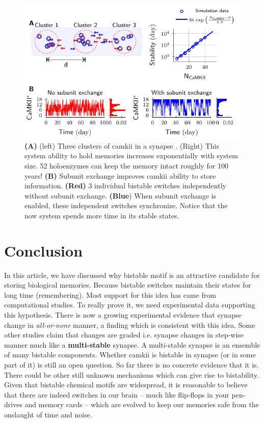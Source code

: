 \documentclass[]{resonance}
\begin{document}
\begin{figure}[t!]
    \caption{ \textbf{(A)} (left) Three clusters of \gls{camkii} in a synapse
        . (Right) This system ability to hold memories increases exponentially
        with system size. 52 holoenzymes can keep the memory intact roughly for
        100 years! \textbf{(B)} Subunit exchange improves \gls{camkii} ability
        to store information. \textbf{(Red)} 3 individual bistable switches independently  
        without subunit exchange. \textbf{(Blue}) When subunit exchange is enabled, these 
        independent switches synchronize. Notice that the now system spends more 
        time in its stable states.
    }\label{fig:camkii_sync}
    \includegraphics[width=\linewidth]{./bistable/Fig5/figure_sync_114mm.pdf}
\end{figure}


\section{Conclusion}

In this article, we have discussed why bistable motif is an attractive candidate
for storing biological memories. Because bistable switches maintain their states
for long time (remembering). Most support for this idea has came from
computational studies. To really prove it, we need experimental data supporting
this hypothesis. There is now a growing experimental evidence that synapse change in
\textit{all-or-none} manner, a finding which is consistent with this idea. Some
other studies claim that changes are graded i.e. synapse changes in step-wise manner
much like a \textbf{multi-stable} synapse. A multi-stable synapse is an ensemble
of many bistable components. Whether \gls{camkii} is bistable in synapse (or in
some part of it) is still an open question. So far there is no concrete evidence
that it is. There could be other still unknown mechanisms which can give rise to
bistability. Given that bistable chemical motifs are widespread, it is
reasonable to believe that there are indeed switches in our brain -- much like
flip-flops in your pen-drives and memory cards -- which are evolved to keep our
memories safe from the onslaught of time and noise.
\end{document}
